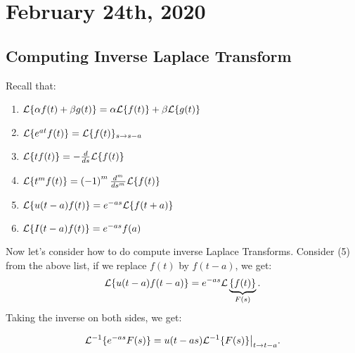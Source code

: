 \documentclass[../main/main.tex]{subfiles}
\begin{document}
\section{February 24th, 2020}
\subsection{Computing Inverse Laplace Transform}
Recall that: 
\begin{enumerate}
	\item $ \mathcal{L} \{\alpha f(t) + \beta g(t)\} =\alpha\mathcal{L} \{f(t)\} +\beta\mathcal{L} \{g(t)\} $
	\item $\mathcal{L} \{e^{a t}f(t) \} = \mathcal{L} \{f(t)\}_{s\to s-a}$
	\item $\mathcal{L} \{tf(t)\} = - \frac{d}{ds}\mathcal{L} \{f(t)\} $
	\item $\mathcal{L} \{t^m f(t)\} = \left( -1 \right) ^{m} \frac{d^{m}}{ds^m}\mathcal{L} \{f(t)\} $
	\item $\mathcal{L} \{u(t-a) f(t)\} = e^{-as}\mathcal{L} \{f(t+a)\} $
	\item $\mathcal{L} \{I(t-a)f(t)\}= e^{-as}f(a)$
\end{enumerate}
Now let's consider how to do compute inverse Laplace Transforms. Consider (5) from the above list, if we replace $f(t)$ by $f(t-a)$, we get: \[
	\mathcal{L} \{u(t-a)f(t-a)\} =e^{-as}\mathcal{L} \underbrace{\{f(t)\} }_{F(s)}
.\] Taking the inverse on both sides, we get: 
\begin{theorem} 
\[
\mathcal{L} ^{-1} \{e^{-as}F(s)\} = u(t-as) \mathcal{L} ^{-1} \{F(s)\} \big\rvert_{t\to t-a}
.\] 
\end{theorem}
\end{document}
